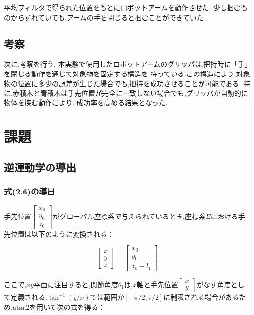 平均フィルタで得られた位置をもとにロボットアームを動作させた.
少し掴むものからずれていても,アームの手を閉じると掴むことができていた.

\subsection{考察}
次に,考察を行う.
本実験で使用したロボットアームのグリッパは,把持時に「手」を閉じる動作を通じて対象物を固定する構造を
持っている.この構造により,対象物の位置に多少の誤差が生じた場合でも,把持を成功させることが可能である.
特に,赤積木と青積木は手先位置が完全に一致しない場合でも,グリッパが自動的に物体を挟む動作により,
成功率を高める結果となった.

\section{課題}

\subsection{逆運動学の導出}
\subsubsection{式(2.6)の導出}

手先位置$\begin{bmatrix} x_0 \\ y_0 \\ z_0 \end{bmatrix}$がグローバル座標系で与えられているとき,座標系$\Sigma$における手先位置は以下のように変換される：

\[
  \begin{bmatrix} x \\ y \\ z \end{bmatrix} = \begin{bmatrix} x_0 \\ y_0 \\ z_0 - l_1 \end{bmatrix} \tag{2.4}
\]

ここで,$xy$平面に注目すると,関節角度$\theta_1$は,$x$軸と手先位置$\begin{bmatrix} x \\ y \end{bmatrix}$がなす角度として定義される.$\tan^{-1}(y/x)$では範囲が$[-\pi/2, \pi/2]$に制限される場合があるため,$\text{atan2}$を用いて次の式を得る：

